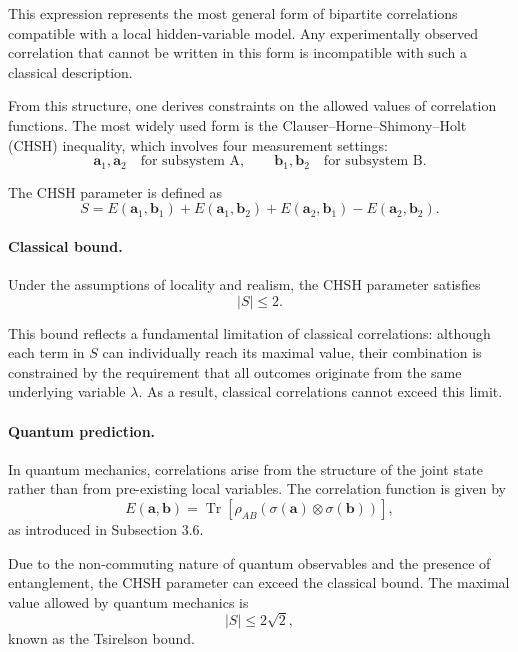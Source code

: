 \documentclass[a4paper]{article}
\begin{document}
\medskip

This expression represents the most general form of bipartite correlations compatible with a local hidden-variable model. Any experimentally observed correlation that cannot be written in this form is incompatible with such a classical description.

\medskip

From this structure, one derives constraints on the allowed values of correlation functions. The most widely used form is the Clauser--Horne--Shimony--Holt (CHSH) inequality, which involves four measurement settings:
\[
\mathbf{a}_1, \mathbf{a}_2 \quad \text{for subsystem A}, \qquad
\mathbf{b}_1, \mathbf{b}_2 \quad \text{for subsystem B}.
\]

The CHSH parameter is defined as
\[
S =
E(\mathbf{a}_1,\mathbf{b}_1)
+
E(\mathbf{a}_1,\mathbf{b}_2)
+
E(\mathbf{a}_2,\mathbf{b}_1)
-
E(\mathbf{a}_2,\mathbf{b}_2).
\]

\medskip

\paragraph{Classical bound.}

Under the assumptions of locality and realism, the CHSH parameter satisfies
\[
|S| \le 2.
\]

This bound reflects a fundamental limitation of classical correlations: although each term in \( S \) can individually reach its maximal value, their combination is constrained by the requirement that all outcomes originate from the same underlying variable \( \lambda \). As a result, classical correlations cannot exceed this limit.

\medskip

\paragraph{Quantum prediction.}

In quantum mechanics, correlations arise from the structure of the joint state rather than from pre-existing local variables. The correlation function is given by
\[
E(\mathbf{a},\mathbf{b})
=
\operatorname{Tr}
\left[
\rho_{AB}
\left(
\sigma(\mathbf{a}) \otimes \sigma(\mathbf{b})
\right)
\right],
\]
as introduced in Subsection 3.6.

\medskip

Due to the non-commuting nature of quantum observables and the presence of entanglement, the CHSH parameter can exceed the classical bound. The maximal value allowed by quantum mechanics is
\[
|S| \le 2\sqrt{2},
\]
known as the Tsirelson bound.
\end{document}
